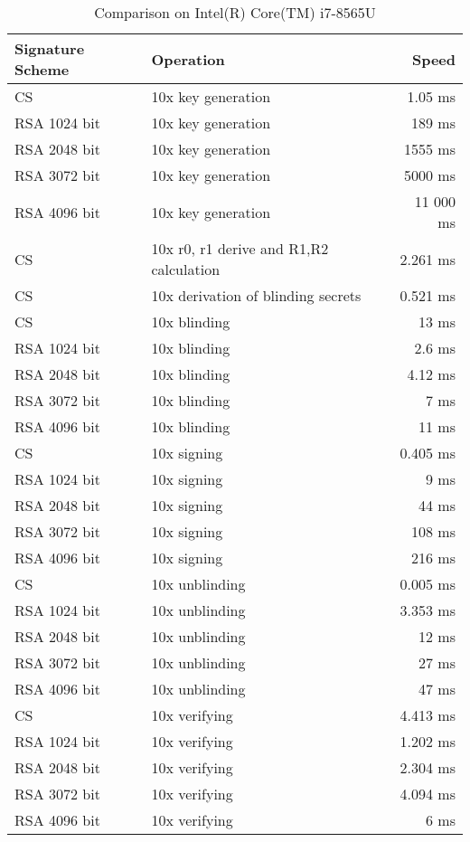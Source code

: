 \begin{table}[ht]
    \centering
    \setupBfhTabular
    \begin{tabular}{llr}
        \rowcolor{BFH-tablehead}
        \textbf{Signature Scheme} & \textbf{Operation} & \textbf{Speed} \\\hline
        CS & 10x key generation & 1.05 ms \\\hline
        RSA 1024 bit & 10x key generation & 189 ms \\\hline
        RSA 2048 bit & 10x key generation & 1555 ms \\\hline
        RSA 3072 bit & 10x key generation & 5000 ms \\\hline
        RSA 4096 bit & 10x key generation & 11 000 ms \\\hline
        \hline
        CS & 10x r0, r1 derive and R1,R2 calculation & 2.261 ms \\\hline
        CS & 10x derivation of blinding secrets & 0.521 ms \\\hline
        CS & 10x blinding & 13 ms \\\hline
        RSA 1024 bit & 10x blinding & 2.6 ms \\\hline
        RSA 2048 bit & 10x blinding & 4.12 ms \\\hline
        RSA 3072 bit & 10x blinding & 7 ms \\\hline
        RSA 4096 bit & 10x blinding & 11 ms \\\hline
        \hline
        CS & 10x signing & 0.405 ms \\\hline
        RSA 1024 bit & 10x signing & 9 ms \\\hline
        RSA 2048 bit & 10x signing & 44 ms \\\hline
        RSA 3072 bit & 10x signing & 108 ms \\\hline
        RSA 4096 bit & 10x signing & 216 ms \\\hline
        \hline
        CS & 10x unblinding & 0.005 ms \\\hline
        RSA 1024 bit & 10x unblinding & 3.353 ms \\\hline
        RSA 2048 bit & 10x unblinding & 12 ms \\\hline
        RSA 3072 bit & 10x unblinding & 27 ms \\\hline
        RSA 4096 bit & 10x unblinding & 47 ms \\\hline
        \hline
        CS & 10x verifying & 4.413 ms \\\hline
        RSA 1024 bit & 10x verifying & 1.202 ms \\\hline
        RSA 2048 bit & 10x verifying & 2.304 ms \\\hline
        RSA 3072 bit & 10x verifying & 4.094 ms \\\hline
        RSA 4096 bit & 10x verifying & 6 ms \\\hline
    \end{tabular}
    \caption{Comparison on Intel(R) Core(TM) i7-8565U}
    \label{tab:comp-sign-intel-i7}
\end{table}

